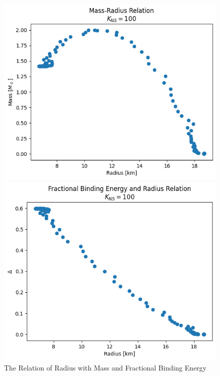 \documentclass[letterpaper,12pt]{article}
\begin{document}
\begin{figure}[H]
\begin{minipage}{.5\textwidth}
\centerline{\includegraphics[width=\linewidth]{figures/17_e_s_m_r.png}}
\end{minipage}
\begin{minipage}{.5\textwidth}
\centerline{\includegraphics[width=\linewidth]{figures/18_e_s_delta_r.png}}
\end{minipage}
\caption{The Relation of Radius with Mass and Fractional Binding Energy}
\label{fig:17_18}
\end{figure}
\end{document}
